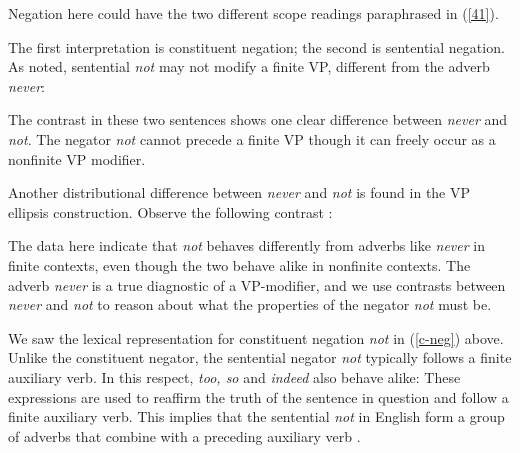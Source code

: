 \documentclass[output=paper
                ,modfonts
                		,nonflat
	        ,collection
	        ,collectionchapter
	        ,collectiontoclongg
 	        ,biblatex
                ,babelshorthands
                ,newtxmath
                ,draftmode
                ,colorlinks, citecolor=brown
]{./langsci/langscibook}
\begin{document}
{\begin{exe}
\begin{xlist}
\begin{exe}
\begin{xlist}
\z
%
Negation here could have the two different scope readings
paraphrased in (\ref{41}).


\eal\label{41}
\zl
%
The first interpretation is constituent negation; the second is
sentential negation. As noted, sentential \textit{not} may not modify a finite
VP, different from the adverb \textit{never}:



\eal
{}
\zl
%
The contrast in these two sentences
shows one clear difference between \textit{never}
and \textit{not}. The negator \textit{not} cannot
precede a finite VP though it can freely occur
as a nonfinite VP modifier.
%
%
%
%

Another distributional difference between \textit{never} and \textit{not} is found in
the VP ellipsis construction.  Observe the following
contrast \citep{KS:02}:

\eal
\label{vpe-not-ex}
\zl
%
\noindent The data here indicate that \textit{not} behaves differently from
adverbs like \textit{never} in finite contexts, even though the two
behave alike in nonfinite contexts. The adverb \textit{never} is a true
diagnostic of a VP-modifier, and we use contrasts between \textit{never} and \textit{not} to reason about what the properties of
the negator \textit{not} must be.


We saw the lexical representation for constituent negation
\textit{not} in (\ref{c-neg}) above. Unlike the
constituent negator, the sentential negator \textit{not} typically
 follows a finite auxiliary verb. In this respect,
   \textit{too, so} and \textit{indeed} also behave alike:
\eal
{}
\zl
%
These expressions are used to
reaffirm the truth of the sentence in question and
follow a finite auxiliary verb.  This implies
that the sentential {\it not} in English
form a group of adverbs that combine with a
preceding auxiliary verb \citep[see]{Kim:00}.


\end{xlist}
\end{exe}
\end{xlist}
\end{exe}}
\end{document}

